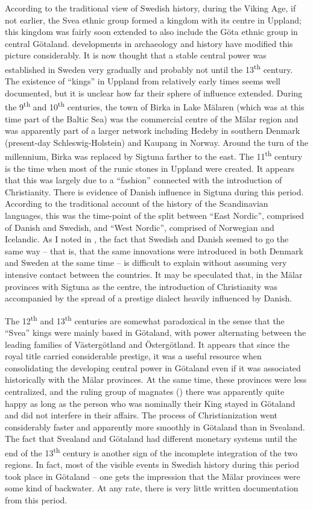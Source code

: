 According to the traditional view of Swedish history, during the Viking Age, if not earlier, the Svea ethnic group formed a kingdom with its centre in Uppland; this kingdom was fairly soon extended to also include the Göta ethnic group in central Götaland. developments in archaeology and history have modified this picture considerably. It is now thought that a stable central power was established in Sweden very gradually and probably not until the 13\textsuperscript{th} century. The existence of “kings” in Uppland from relatively early times seems well documented, but it is unclear how far their sphere of influence extended. During the 9\textsuperscript{th} and 10\textsuperscript{th} centuries, the town of Birka in Lake Mälaren (which was at this time part of the Baltic Sea) was the commercial centre of the Mälar region and was apparently part of a larger network including Hedeby in southern Denmark (present-day Schleswig-Holstein) and Kaupang in Norway. Around the turn of the millennium, Birka was replaced by Sigtuna farther to the east. The 11\textsuperscript{th} century is the time when most of the runic stones in Uppland were created. It appears that this was largely due to a “fashion” connected with the introduction of Christianity. There is evidence of Danish influence in Sigtuna during this period. According to the traditional account of the history of the Scandinavian languages, this was the time-point of the split between “East Nordic”, comprised of Danish and Swedish, and “West Nordic”, comprised of Norwegian and Icelandic. As I noted in \citet{Dahl2001}, the fact that Swedish and Danish seemed to go the same way – that is, that the same innovations were introduced in both Denmark and Sweden at the same time – is difficult to explain without assuming very intensive contact between the countries. It may be speculated that, in the Mälar provinces with Sigtuna as the centre, the introduction of Christianity was accompanied by the spread of a prestige dialect heavily influenced by Danish. 

The 12\textsuperscript{th} and 13\textsuperscript{th} centuries are somewhat paradoxical in the sense that the “Svea” kings were mainly based in Götaland, with power alternating between the leading families of Västergötland and Östergötland. It appears that since the royal title carried considerable prestige, it was a useful resource when consolidating the developing central power in Götaland even if it was associated historically with the Mälar provinces. At the same time, these provinces were less centralized, and the ruling group of magnates () there was apparently quite happy as long as the person who was nominally their King stayed in Götaland and did not interfere in their affairs. The process of Christianization went considerably faster and apparently more smoothly in Götaland than in Svealand. The fact that Svealand and Götaland had different monetary systems until the end of the 13\textsuperscript{th} century is another sign of the incomplete integration of the two regions. In fact, most of the visible events in Swedish history during this period took place in Götaland – one gets the impression that the Mälar provinces were some kind of backwater. At any rate, there is very little written documentation from this period. 

